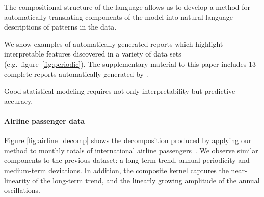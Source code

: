 The compositional structure of the language allows us to develop a method
for automatically translating components of the model into
natural-language descriptions of patterns in the data.

We show examples of automatically generated reports which highlight
interpretable features discovered in a variety of data sets (e.g.\
figure~\ref{fig:periodic}).  The supplementary material to this paper
includes 13 complete reports automatically generated by \procedurename{}.

Good statistical modeling requires not only
interpretability but predictive accuracy.





\paragraph{Airline passenger data}



Figure \ref{fig:airline_decomp} shows the decomposition produced by applying our method to monthly totals of international airline passengers~\citep{box2011time}.
We observe similar components to the previous dataset: a long term trend, annual periodicity and medium-term deviations.
In addition, the composite kernel captures the near-linearity of the long-term trend, and the linearly growing amplitude of the annual oscillations.



